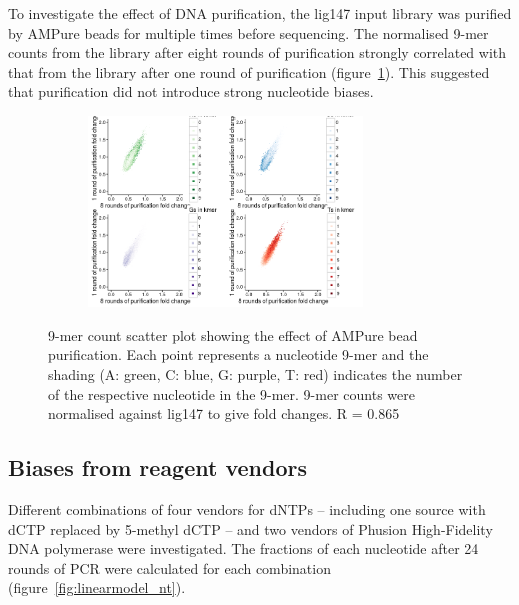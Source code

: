 \documentclass[a4paper, numbers=noenddot]{scrbook}
\begin{document}
To investigate the effect of DNA purification, the lig147 input library was purified by AMPure beads for multiple times before sequencing.  The normalised 9-mer counts from the library after eight rounds of purification strongly correlated with that from the library after one round of purification (figure~\ref{fig:kmer_pur}).  This suggested that purification did not introduce strong nucleotide biases.

\begin{figure}[htbp]
  \centering
  \begin{subfigure}[htbp]{0.8\textwidth}
  \centering
  \includegraphics[width=0.8\textwidth]{kmer_ampure}
  \end{subfigure}
  \caption{9-mer count scatter plot showing the effect of AMPure bead purification.  Each point represents a nucleotide 9-mer and the shading (A: green, C: blue, G: purple, T: red) indicates the number of the respective nucleotide in the 9-mer.  9-mer counts were normalised against lig147 to give fold changes.  R = 0.865}
  \label{fig:kmer_pur}
\end{figure}

\subsection{Biases from reagent vendors}
\label{ssec:pcrbias_result_reagent}

Different combinations of four vendors for dNTPs -- including one source with dCTP replaced by 5-methyl dCTP -- and two vendors of Phusion High-Fidelity DNA polymerase were investigated.  The fractions of each nucleotide after 24 rounds of PCR were calculated for each combination (figure~\ref{fig:linearmodel_nt}).
\end{document}
